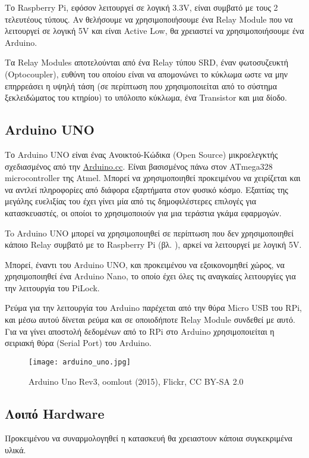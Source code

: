 		Το Raspberry Pi, εφόσον λειτουργεί σε λογική 3.3V, είναι συμβατό με τους 2 τελευτέους τύπους. Αν θελήσουμε να χρησιμοποιήσουμε ένα Relay Module που να λειτουργεί σε λογική 5V και είναι Active Low, θα χρειαστεί να χρησιμοποιήσουμε ένα Arduino.

		Τα Relay Modules αποτελούνται από ένα Relay τύπου SRD, έναν φωτοσυζευκτή (Optocoupler), ευθύνη του οποίου είναι να απομονώνει το κύκλωμα ωστε να μην επηρρεάσει η υψηλή τάση (σε περίπτωση που χρησιμοποιείται από το σύστημα ξεκλειδώματος του κτηρίου) το υπόλοιπο κύκλωμα, ένα Transistor και μια δίοδο. %


	\subsection{Arduino UNO}
		Το Arduino UNO είναι ένας Ανοικτού-Κώδικα (Open Source) μικροελεγκτής σχεδιασμένος από την \href{https://www.arduino.cc/}{Arduino.cc}. Είναι βασισμένος πάνω στον ATmega328 microcontroller της Atmel. Μπορεί να χρησιμοποιηθεί προκειμένου να χειρίζεται και να αντλεί πληροφορίες από διάφορα εξαρτήματα στον φυσικό κόσμο. Εξαιτίας της μεγάλης ευελιξίας του έχει γίνει μία από τις δημοφιλέστερες επιλογές για κατασκευαστές, οι οποίοι το χρησιμοποιούν για μια τεράστια γκάμα εφαρμογών\textsuperscript{\cite{arduino_definition}}.

		To Arduino UNO μπορεί να χρησιμοποιηθεί σε περίπτωση που δεν χρησιμοποιηθεί κάποιο Relay συμβατό με το Raspberry Pi (βλ. ), αρκεί να λειτουργεί με λογική 5V.

		Μπορεί, έναντι του Arduino UNO, και προκειμένου να εξοικονομηθεί χώρος, να χρησιμοποιηθεί ένα Arduino Nano, το οποίο έχει όλες τις αναγκαίες λειτουργίες για την λειτουργία του PiLock.

		Ρεύμα για την λειτουργία του Arduino παρέχεται από την θύρα Micro USB του RPi, και μέσω αυτού δίνεται ρεύμα και σε οποιοδήποτε Relay Module συνδεθεί με αυτό. Για να γίνει αποστολή δεδομένων από το RPi στο Arduino χρησιμοποιείται η σειριακή θύρα (Serial Port) του Arduino.

		\begin{figure}[h]
			\centering
				\texttt{[image: arduino\_uno.jpg]}
			\caption{Arduino Uno Rev3, oomlout (2015), Flickr, CC BY-SA 2.0}
		\end{figure}

	\subsection{Λοιπό Hardware}
		Προκειμένου να συναρμολογηθεί η κατασκευή θα χρειαστουν κάποια συγκεκριμένα υλικά.

